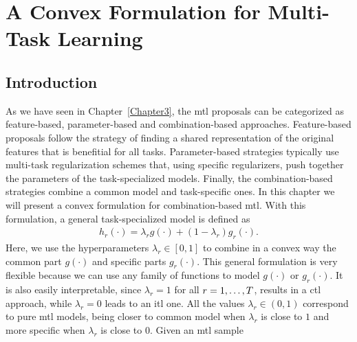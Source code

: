 
\chapter{A Convex Formulation for Multi-Task Learning} %
\label{Chapter4}

{\bf \small{

}}

\section{Introduction}
As we have seen in Chapter~\ref{Chapter3}, the \acrfull{mtl} proposals can be categorized as feature-based, parameter-based and combination-based approaches. Feature-based proposals follow the strategy of finding a shared representation of the original features that is benefitial for all tasks. Parameter-based strategies typically use multi-task regularization schemes that, using specific regularizers, push together the parameters of the task-specialized models.
Finally, the combination-based strategies combine a common model and task-specific ones. 
%
In this chapter we will present a convex formulation for combination-based \acrshort{mtl}. With this formulation, a general task-specialized model is defined as
\begin{equation}
    \label{eq:convexmtl_general}
    \begin{aligned}
        h_r(\cdot)
       = \lambda_r g(\cdot) + (1 - \lambda_r) g_r(\cdot) .
    \end{aligned}    
\end{equation}
Here, we use the hyperparameters $\lambda_r \in [0, 1]$ to combine in a convex way the common part $g(\cdot)$ and specific parts $g_r(\cdot)$. This general formulation is very flexible because we can use any family of functions to model $g(\cdot)$ or $g_r(\cdot)$. It is also easily interpretable, since $\lambda_r=1$ for all $r=1, \ldots, T$, results in a \acrfull{ctl} approach, while $\lambda_r=0$ leads to an \acrfull{itl} one. All the values $\lambda_r \in (0, 1)$ correspond to pure \acrshort{mtl} models, being closer to common model when $\lambda_r$ is close to $1$ and more specific when $\lambda_r$ is close to $0$.
%
Given an \acrshort{mtl} sample 
